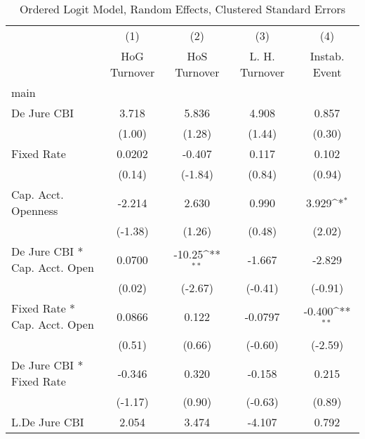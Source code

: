{
\def\sym#1{\ifmmode^{#1}\else\(^{#1}\)\fi}
\begin{longtable}{l*{4}{c}}
\caption{Ordered Logit Model, Random Effects, Clustered Standard Errors \label{kapintlagordLogLogDJ}}\\
\hline\hline\endfirsthead\hline\endhead\hline\endfoot\endlastfoot
                &\multicolumn{1}{c}{(1)}&\multicolumn{1}{c}{(2)}&\multicolumn{1}{c}{(3)}&\multicolumn{1}{c}{(4)}\\
                &\multicolumn{1}{c}{HoG Turnover}&\multicolumn{1}{c}{HoS Turnover}&\multicolumn{1}{c}{L. H. Turnover}&\multicolumn{1}{c}{Instab. Event}\\
\hline
main            &                  &                  &                  &                  \\
De Jure CBI     &    3.718         &    5.836         &    4.908         &    0.857         \\
                &   (1.00)         &   (1.28)         &   (1.44)         &   (0.30)         \\
[1em]
Fixed Rate      &   0.0202         &   -0.407         &    0.117         &    0.102         \\
                &   (0.14)         &  (-1.84)         &   (0.84)         &   (0.94)         \\
[1em]
Cap. Acct. Openness&   -2.214         &    2.630         &    0.990         &    3.929\sym{*}  \\
                &  (-1.38)         &   (1.26)         &   (0.48)         &   (2.02)         \\
[1em]
De Jure CBI * Cap. Acct. Open&   0.0700         &   -10.25\sym{**} &   -1.667         &   -2.829         \\
                &   (0.02)         &  (-2.67)         &  (-0.41)         &  (-0.91)         \\
[1em]
Fixed Rate * Cap. Acct. Open&   0.0866         &    0.122         &  -0.0797         &   -0.400\sym{**} \\
                &   (0.51)         &   (0.66)         &  (-0.60)         &  (-2.59)         \\
[1em]
De Jure CBI * Fixed Rate&   -0.346         &    0.320         &   -0.158         &    0.215         \\
                &  (-1.17)         &   (0.90)         &  (-0.63)         &   (0.89)         \\
[1em]
L.De Jure CBI   &    2.054         &    3.474         &   -4.107         &    0.792         \\

\end{longtable}}
